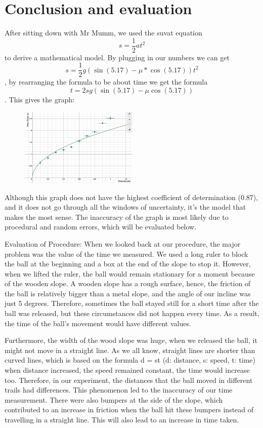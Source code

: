 \documentclass[12pt]{report}
\begin{document}
\section{Conclusion and evaluation}
After sitting down with Mr Mumm, we used the suvat equation \[s = \frac{1}{2}at^2\] to derive a mathematical model. By plugging in our numbers we can get \[s = \frac{1}{2}g(\sin(5.17) - \mu*\cos(5.17)) t^2\], by rearranging the formula to be about time we get the formula \[t =2sg(\sin(5.17)-\mu \cos(5.17))\]. This gives the graph:
\begin{figure}
    \centering
    \includegraphics[width=0.5\textwidth]{graph3.png}
\end{figure}
Although this graph does not have the highest coefficient of determination (0.87), and it does not go through all the windows of uncertainty, it’s the model that makes the most sense. The inaccuracy of the graph is most likely due to procedural and random errors, which will be evaluated below.

Evaluation of Procedure:
When we looked back at our procedure, the major problem was the value of the time we measured. We used a long ruler to block the ball at the beginning and a box at the end of the slope to stop it. However, when we lifted the ruler, the ball would remain stationary for a moment because of the wooden slope. A wooden slope has a rough surface, hence, the friction of the ball is relatively bigger than a metal slope, and the angle of our incline was just 5 degrees. Therefore, sometimes the ball stayed still for a short time after the ball was released, but these circumstances did not happen every time. As a result, the time of the ball’s movement would have different values.

Furthermore, the width of the wood slope was huge, when we released the ball, it might not move in a straight line. As we all know, straight lines are shorter than curved lines, which is based on the formula d = st (d: distance, s: speed, t: time) when distance increased, the speed remained constant, the time would increase too. Therefore, in our experiment, the distances that the ball moved in different trails had differences. This phenomenon led to the inaccuracy of our time measurement. There were also bumpers at the side of the slope, which contributed to an increase in friction when the ball hit these bumpers instead of travelling in a straight line. This will also lead to an increase in time taken.
\end{document}
